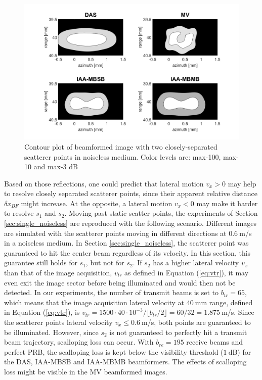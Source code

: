 \begin{figure}[ht]
    \centering
    \includegraphics[width=\linewidth]{./images/results/2.2/motion_0_0.png}
    \caption{Contour plot of beamformed image with two closely-separated scatterer points in noiseless medium. Color levels are: max-100, max-10 and max-3 dB}
    \label{fig:two_points_static}
\end{figure}

Based on those reflections, one could predict that lateral motion $v_x > 0$ may help to resolve closely separated scatterer points, since their apparent relative distance $\delta x_{BF}$ might increase. At the opposite, a lateral motion $v_x < 0$ may make it harder to resolve $s_1$ and $s_2$. 
Moving past static scatter points, the experiments of Section \ref{sec:single_noiseless} are reproduced with the following scenario.  Different images are simulated with the scatterer points moving in different directions at $0.6~$m/s in a noiseless medium.
In Section \ref{sec:single_noiseless}, the scatterer point was guaranteed to hit the center beam regardless of its velocity. In this section, this guarantee still holds for $s_1$, but not for $s_2$. If $s_2$ has a higher lateral velocity $v_x$ than that of the image acquisition, $v_{tr}$ as defined in Equation (\ref{eq:vtr}), it may even exit the image sector before being illuminated and would then not be detected. In our experiments, the number of transmit beams is set to $b_{tr} = 65$, which means that the image acquisition lateral velocity at $40~$mm range, defined in Equation (\ref{eq:vtr}), is $v_{tr} = 1500 \cdot 40 \cdot 10^{-3} / \lfloor b_{tr} / 2 \rfloor = 60 / 32 = 1.875~$m/s. Since the scatterer points lateral velocity $v_x \leq 0.6~$m/s, both points are guaranteed to be illuminated.
However, since $s_2$ is not guaranteed to perfectly hit a transmit beam trajectory, scalloping loss can occur. With $b_{re} = 195$ receive beams and perfect PRB, the scalloping loss is kept below the visibility threshold ($1~$dB) for the DAS, IAA-MBSB and IAA-MBMB beamformers. The effects of scalloping loss might be visible in the MV beamformed images.

